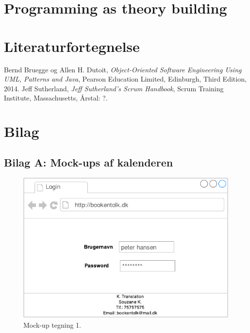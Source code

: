 \documentclass[12pt]{article}   %
\begin{document}
\section{Programming as theory building}



\pagebreak

\section{Literaturfortegnelse}
\begin{thebibliography}{9}
		Bernd Bruegge og Allen H. Dutoit,
		\emph{Object-Oriented Software Engineering Using UML, Patterns
		and Java},
		Pearson Education Limited, Edinburgh,
		Third Edition,
		2014.
		Jeff Sutherland,
		\emph{Jeff Sutherland's Scrum Handbook},
		Scrum Training Institute, Massachusetts,
		Årstal: ?.


\end{thebibliography}

\newpage

\section{Bilag}

\subsection{Bilag A: Mock-ups af kalenderen}

\begin{figure}[!ht]
\begin{center}
\includegraphics{mock1.pdf}
\caption{Mock-up tegning 1.}
\end{center}
\end{figure}
\end{document}
